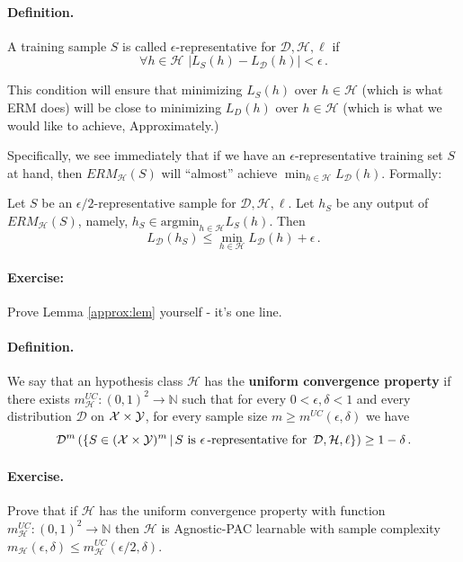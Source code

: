 \documentclass[11pt]{article}
\newcommand{\Dc}{\mathcal{D}}
\newcommand{\Hc}{\mathcal{H}}
\begin{document}
\paragraph{Definition.}
    A training sample $S$ is called $\epsilon$-representative for $\Dc,\Hc,\ell$ if 
    \[
      \forall h\in\Hc \,\, \Big| L_S(h)-L_\Dc(h) \Big|<\epsilon\,.
    \]

This condition will ensure that minimizing $L_S(h)$ over $h\in\Hc$
(which is what ERM does) will be close to minimizing $L_D(h)$ over $h\in\Hc$
(which is what we would like to achieve, Approximately.)

\noindent Specifically, we see immediately that if we have an $\epsilon$-representative training set
$S$ at hand, then $ERM_\Hc(S)$ will ``almost'' achieve $\min_{h\in\Hc}L_\Dc(h)$.
Formally:

\begin{lemma}
    \label{approx:lem}
    Let $S$ be an $\epsilon/2$-representative sample for $\Dc,\Hc,\ell$. 
    Let $h_S$ be any output of $ERM_\Hc(S)$, namely,
    $h_S\in\text{argmin}_{h\in\Hc}L_S(h)$. Then 
    \[
        L_\Dc(h_S) \leq \min_{h\in\Hc}L_\Dc(h) + \epsilon \,.
    \]
\end{lemma}

\paragraph{Exercise:} Prove Lemma \ref{approx:lem} yourself - it's one
line.
%
\paragraph{Definition.} We say that an hypothesis class $\Hc$ has the 
{\bf uniform convergence property} if there exists
$m^{UC}_\Hc:(0,1)^2\to\mathbb{N}$ such that for every $0<\epsilon,\delta<1$ and
every distribution $\Dc$ on $\mathcal{X}\times \mathcal{Y}$, for every sample size
$m\geq m^{UC}(\epsilon,\delta)$ we have
\[
  \D^m\left( \left\{ S\in(\X\times\Y)^m\,|\,
  S\,\,\text{is}\,\, \epsilon\,\text{-representative for }\,\Dc,\Hc,\ell\right\} \right)\geq
  1-\delta\,.
\]

\paragraph{Exercise.}
Prove that if $\Hc$ has the uniform convergence property with function 
$m^{UC}_\Hc:(0,1)^2\to\mathbb{N}$  then $\Hc$ is Agnostic-PAC learnable with
sample complexity 
$m_\Hc(\epsilon,\delta) \leq m_\Hc^{UC}(\epsilon/2,\delta)$.
\end{document}

